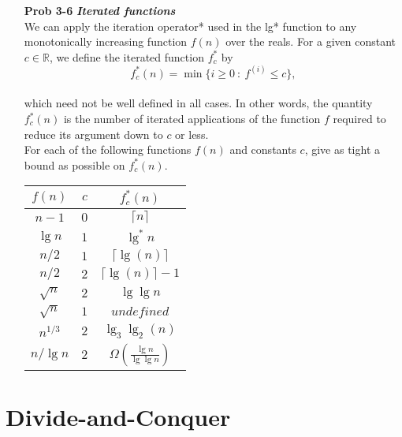 \documentclass[fontsize=12pt,paper=a4]{book}
\begin{document}
\begin{enumerate}
 \item[\textbf{Prob 3-6}]
       \textbf{\textit{Iterated functions}}\\
       We can apply the iteration operator* used in the lg* function to any monotonically increasing function $f(n)$ over the reals. For a given constant $c \in \mathbb{R}$, we define the iterated function $f_c^*$ by\\
       \[ f_c^*(n) = \min\{ i \geq 0\ :\ f^{(i)} \leq c\},\] \\
       which need not be well defined in all cases. In other words, the quantity $f_c^*(n)$ is the number of iterated applications of the function $f$ required to reduce its argument down to $c$ or less.\\
       For each of the following functions $f(n)$ and constants $c$, give as tight a bound as possible on $f_c^*(n)$. \\
       \begin{tabular}{c c | c |}
        $f(n)$     & $c$ & $f_c^*(n)$                        \\
        \hline
        $n-1$      & $0$ & $\lceil n \rceil$                 \\
        \hline
        $\lg n$    & $1$ & $\lg^* n$                         \\
        \hline
        $n/2$      & $1$ & $\lceil \lg(n) \rceil$            \\
        \hline
        $n/2$      & $2$ & $\lceil \lg(n) \rceil - 1$        \\
        \hline
        $\sqrt{n}$ & $2$ & $\lg \lg n$                       \\
        \hline
        $\sqrt{n}$ & $1$ & $undefined$                       \\
        \hline
        $n^{1/3}$  & $2$ & $\lg_3 \lg_2 (n)$                 \\
        \hline
        $n/\lg n$  & $2$ & $\Omega(\frac{\lg n}{\lg \lg n})$ \\
        \hline
       \end{tabular}
       
\end{enumerate}

\chapter{Divide-and-Conquer}
\end{document}
